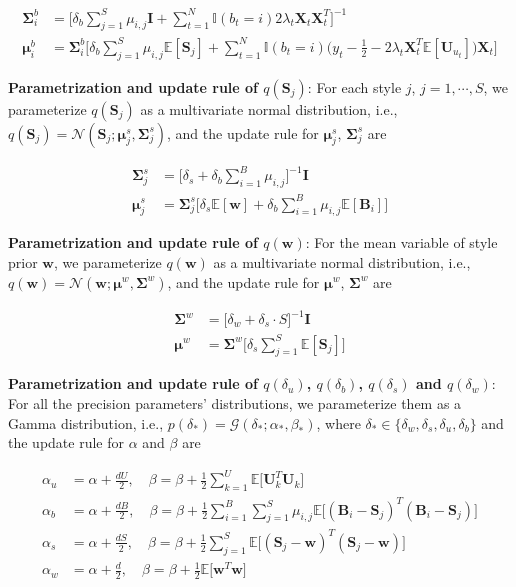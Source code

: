 \begin{align}
\bm{\Sigma}^b_i & = \Big[\delta_b\sum_{j=1}^S\mu_{i,j}\mathbf{I}+\sum_{t=1}^N\mathbb{I}(b_t=i)2\lambda_{t}\mathbf{X}_t\mathbf{X}_t^T\Big]^{-1} \\ 
\bm{\mu}^b_i & = \bm{\Sigma}_i^b\Big[  \delta_b\sum_{j=1}^S\mu_{i,j}\mathbb{E}[\mathbf{S}_j]+ 
 \sum_{t=1}^N\mathbb{I}(b_t=i)\big(y_t-\frac{1}{2}- 2\lambda_{t}\mathbf{X}_t^T\mathbb{E}[\mathbf{U}_{u_t}]\big)\bm{X}_t \Big]
\end{align}


\noindent \textbf{Parametrization and update rule of $q(\mathbf{S}_j)$}:
For each style $j$, $j = 1, \cdots, S$, we parameterize $q(\mathbf{S}_j)$ as a multivariate normal distribution, i.e., $q(\mathbf{S}_j) = \mathcal{N}(\mathbf{S}_j; \bm{\mu}^s_j, \bm{\Sigma}^s_j)$, and the update rule for $\bm{\mu}^s_j$, $\bm{\Sigma}^s_j$ are 

\begin{align}
\bm{\Sigma}^s_j & = \big[\delta_s+\delta_b\sum_{i=1}^{B}\mu_{i,j}\big]^{-1}\mathbf{I} \\ 
\bm{\mu}^s_j & = \bm{\Sigma}_j^{s}\Big[ \delta_s\mathbb{E}[\bm{w}]+\delta_b\sum_{i=1}^B\mu_{i,j}\mathbb{E}[\mathbf{B}_i] \Big]
\end{align}


\noindent \textbf{Parametrization and update rule of $q(\mathbf{w})$}:
For the mean variable of style prior $\mathbf{w}$, we parameterize $q(\mathbf{w})$ as a multivariate normal distribution, i.e., $q(\mathbf{w}) = \mathcal{N}(\mathbf{w}; \bm{\mu}^w, \bm{\Sigma}^w)$, and the update rule for $\bm{\mu}^w$, $\bm{\Sigma}^w$ are 

\begin{align}
\bm{\Sigma}^w & = \big[\delta_w+\delta_s\cdot S\big]^{-1}\mathbf{I}\\ 
\bm{\mu}^w & = \bm{\Sigma}^w\Big[ \delta_s\sum_{j=1}^S\mathbb{E}[\mathbf{S}_j] \Big]
\end{align}



\noindent \textbf{Parametrization and update rule of $q(\delta_u)$, $q(\delta_b)$, $q(\delta_s)$ and $q(\delta_w)$}:
For all the precision parameters' distributions, we parameterize them as a Gamma distribution, i.e., $p(\delta_*) = \mathcal{G}(\delta_*; \alpha_*, \beta_* )$, where $\delta_* \in \{ \delta_w, \delta_s, \delta_u, \delta_b \}$ and the update rule for $\alpha$ and $\beta$ are 

\begin{align}
\alpha_u & = \alpha + \frac{dU}{2},\quad  \beta=\beta+\frac{1}{2}\sum_{k=1}^{U}\mathbb{E}\big[\mathbf{U}_k^T\mathbf{U}_k\big] \\ 
\alpha_b & = \alpha + \frac{dB}{2},\quad  \beta=\beta+\frac{1}{2}\sum_{i=1}^{B}\sum_{j=1}^{S}\mu_{i,j}\mathbb{E}\big[(\mathbf{B}_i-\mathbf{S}_j)^T(\mathbf{B}_i-\mathbf{S}_j)\big] \\
\alpha_s & = \alpha + \frac{dS}{2},\quad  \beta=\beta+\frac{1}{2}\sum_{j=1}^{S}\mathbb{E}\big[(\mathbf{S}_j-\mathbf{w})^T(\mathbf{S}_j-\mathbf{w})\big] \\
\alpha_w & = \alpha + \frac{d}{2},\quad  \beta=\beta+\frac{1}{2}\mathbb{E}\big[\mathbf{w}^T\mathbf{w}\big] 
\end{align}


